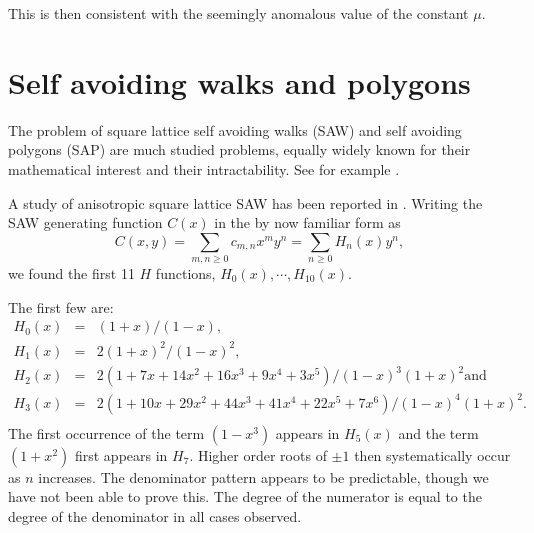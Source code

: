 This is then consistent with the seemingly anomalous 
value of the constant $\mu.$

\section {Self avoiding walks and polygons}
The problem of square lattice self avoiding walks (SAW)
and self avoiding polygons (SAP) are much studied
problems,  equally widely known for their mathematical 
interest and their intractability. See for example \cite{Hug96,Mad96}.

A study of anisotropic square lattice SAW has been
reported in \cite{CG96}. Writing the SAW generating function
$C(x)$ in the by now familiar form as
\begin{equation}
C(x,y) = \sum_{m,n\ge 0} c_{m,n}x^my^n = \sum_{n\ge 0} H_n(x)y^n, 
\end{equation}
 we found the first 11 $H$ functions, $H_0(x), \cdots , H_{10}(x).$

The first few  are:
\begin{eqnarray*}
H_0(x)& =& (1 + x)/(1 - x), \\
H_1(x)& =& 2(1 + x)^2/(1 - x)^2,\\ 
H_2(x)& =& 2(1 + 7x + 14x^2 + 16x^3 + 9x^4+ 3x^5)/(1 - x)^3(1+x)^2  \mbox{
and} \\
H_3(x)& =& 2(1 + 10x + 29x^2 + 44x^3 + 41x^4 + 22x^5 + 7x^6)/(1 - x)^4(1 +
x)^2.\\
\end{eqnarray*}
The first occurrence of the term $(1-x^3)$ appears in $H_5(x)$ and the
term $(1 + x^2)$ first appears in $H_7.$ Higher order roots of $\pm 1$
then systematically occur as $n$ increases. The denominator pattern
appears to be predictable, though we have not been able to prove
this. The degree of the numerator is equal to the degree of the
denominator in all cases observed.

